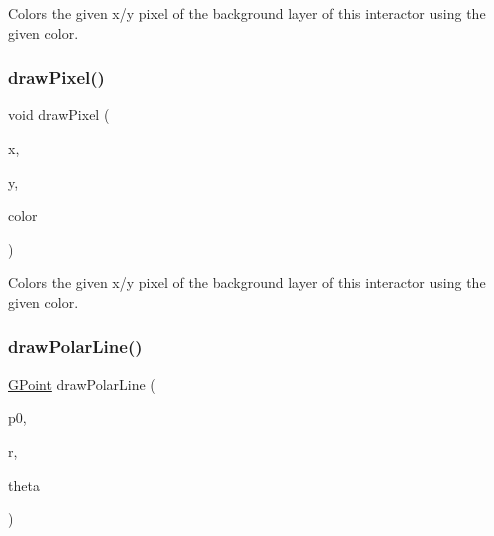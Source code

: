 Colors the given x/y pixel of the background layer of this interactor using the given color. 

\mbox{\label{classsgl_1_1GDrawingSurface_a20abc26a94b7eb310e34abf668e0f5f4}} 
\subsubsection{\texorpdfstring{draw\+Pixel()}{drawPixel()}\hspace{0.1cm}{\footnotesize\ttfamily [3/3]}}
{\footnotesize\ttfamily void draw\+Pixel (\begin{DoxyParamCaption}\item[{double}]{x,  }\item[{double}]{y,  }\item[{const std\+::string \&}]{color }\end{DoxyParamCaption})\hspace{0.3cm}{\ttfamily [virtual]}}



Colors the given x/y pixel of the background layer of this interactor using the given color. 

\mbox{\label{classsgl_1_1GDrawingSurface_af70cce1e4f708f1ed5b6f29cecb660e7}} 
\subsubsection{\texorpdfstring{draw\+Polar\+Line()}{drawPolarLine()}\hspace{0.1cm}{\footnotesize\ttfamily [1/2]}}
{\footnotesize\ttfamily \mbox{\hyperlink{structsgl_1_1GPoint}{G\+Point}} draw\+Polar\+Line (\begin{DoxyParamCaption}\item[{const \mbox{\hyperlink{structsgl_1_1GPoint}{G\+Point}} \&}]{p0,  }\item[{double}]{r,  }\item[{double}]{theta }\end{DoxyParamCaption})\hspace{0.3cm}{\ttfamily [virtual]}}



